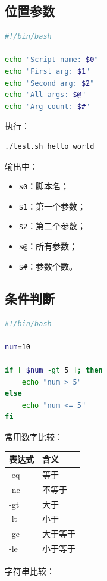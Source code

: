 \documentclass[UTF8,a4paper,12pt]{ctexart}
\begin{document}
\subsection{位置参数}

\begin{lstlisting}[language=bash]
#!/bin/bash

echo "Script name: $0"
echo "First arg: $1"
echo "Second arg: $2"
echo "All args: $@"
echo "Arg count: $#"
\end{lstlisting}

执行：

\begin{lstlisting}[language=bash]
./test.sh hello world
\end{lstlisting}

输出中：
\begin{itemize}
    \item \texttt{\$0}：脚本名；
    \item \texttt{\$1}：第一个参数；
    \item \texttt{\$2}：第二个参数；
    \item \texttt{\$@}：所有参数；
    \item \texttt{\$\#}：参数个数。
\end{itemize}

\subsection{条件判断}

\begin{lstlisting}[language=bash]
#!/bin/bash

num=10

if [ $num -gt 5 ]; then
    echo "num > 5"
else
    echo "num <= 5"
fi
\end{lstlisting}

常用数字比较：

\begin{longtable}{p{4cm}p{10cm}}
\toprule
表达式 & 含义 \\
\midrule
-eq & 等于 \\
-ne & 不等于 \\
-gt & 大于 \\
-lt & 小于 \\
-ge & 大于等于 \\
-le & 小于等于 \\
\bottomrule
\end{longtable}

字符串比较：
\end{document}
